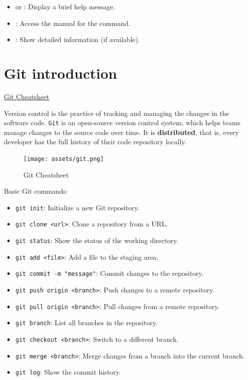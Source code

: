 \begin{tipsblock}
    \begin{itemize}
        \item {} or : Display a brief help message.
        \item {}: Access the manual for the command.
        \item {}: Show detailed information (if available).
    \end{itemize}
\end{tipsblock}


\newpage
\section{Git introduction}

\href{https://ndpsoftware.com/git-cheatsheet.html#loc=workspace}{Git Cheatsheet}

Version control is the practice of tracking and managing the changes in the software code. \texttt{Git} is an open-source version control system, 
which helps teams manage changes to the source code over time. It is \textbf{distributed}, that is, every developer has the full history of their code repository locally.

\begin{figure}[H]
    \centering
    \texttt{[image: assets/git.png]}
    \caption{Git Cheatsheet}
    \label{fig:git_cs}
\end{figure}

\vspace{-1em}

Basic Git commands:
\begin{itemize}
    \item \texttt{git init}: Initialize a new Git repository.
    \item \texttt{git clone <url>}: Clone a repository from a URL.
    \item \texttt{git status}: Show the status of the working directory.
    \item \texttt{git add <file>}: Add a file to the staging area.
    \item \texttt{git commit -m "message"}: Commit changes to the repository.
    \item \texttt{git push origin <branch>}: Push changes to a remote repository.
    \item \texttt{git pull origin <branch>}: Pull changes from a remote repository.
    \item \texttt{git branch}: List all branches in the repository.
    \item \texttt{git checkout <branch>}: Switch to a different branch.
    \item \texttt{git merge <branch>}: Merge changes from a branch into the current branch.
    \item \texttt{git log}: Show the commit history.
\end{itemize}

